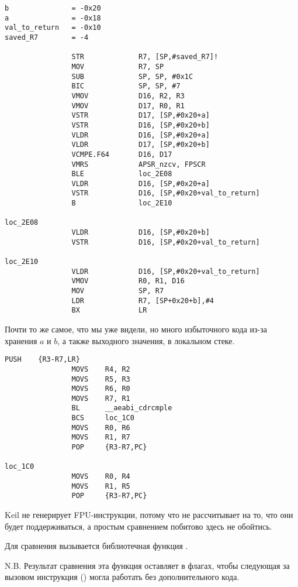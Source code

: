 \begin{lstlisting}[caption=\NonOptimizingXcodeIV (\ARMMode),style=customasmARM]
b               = -0x20
a               = -0x18
val_to_return   = -0x10
saved_R7        = -4

                STR             R7, [SP,#saved_R7]!
                MOV             R7, SP
                SUB             SP, SP, #0x1C
                BIC             SP, SP, #7
                VMOV            D16, R2, R3
                VMOV            D17, R0, R1
                VSTR            D17, [SP,#0x20+a]
                VSTR            D16, [SP,#0x20+b]
                VLDR            D16, [SP,#0x20+a]
                VLDR            D17, [SP,#0x20+b]
                VCMPE.F64       D16, D17
                VMRS            APSR_nzcv, FPSCR
                BLE             loc_2E08
                VLDR            D16, [SP,#0x20+a]
                VSTR            D16, [SP,#0x20+val_to_return]
                B               loc_2E10

loc_2E08
                VLDR            D16, [SP,#0x20+b]
                VSTR            D16, [SP,#0x20+val_to_return]

loc_2E10
                VLDR            D16, [SP,#0x20+val_to_return]
                VMOV            R0, R1, D16
                MOV             SP, R7
                LDR             R7, [SP+0x20+b],#4
                BX              LR
\end{lstlisting}

Почти то же самое, что мы уже видели, 
но много избыточного кода из-за хранения $a$ и $b$, 
а также выходного значения, в локальном стеке.


\myparagraph{\OptimizingKeilVI (\ThumbMode)}

\begin{lstlisting}[caption=\OptimizingKeilVI (\ThumbMode),style=customasmARM]
                PUSH    {R3-R7,LR}
                MOVS    R4, R2
                MOVS    R5, R3
                MOVS    R6, R0
                MOVS    R7, R1
                BL      __aeabi_cdrcmple
                BCS     loc_1C0
                MOVS    R0, R6
                MOVS    R1, R7
                POP     {R3-R7,PC}

loc_1C0
                MOVS    R0, R4
                MOVS    R1, R5
                POP     {R3-R7,PC}
\end{lstlisting}

Keil не генерирует FPU-инструкции, потому что не 
рассчитывает на то, что они будет поддерживаться, а простым сравнением побитово здесь не обойтись.

Для сравнения вызывается библиотечная функция . 

N.B. Результат сравнения эта функция оставляет в флагах, чтобы следующая за вызовом инструкция
 ()
могла работать без дополнительного кода.

